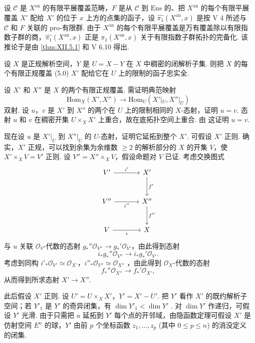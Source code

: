 设 $\mathcal{C}$ 是 $X^{\mathrm{an}}$ 的有限平展覆盖范畴，$F$ 是从 $\mathcal{C}$ 到 $\mathrm{Ens}$ 的、把 $X^{\mathrm{an}}$ 的每个有限平展覆盖 $X'$ 配给 $X'$ 的位于 $x$ 上方的点集的函子，设 $\widehat{\pi_1}(X^{\mathrm{an}}, x)$ 是按 V 4 所述与 $\mathcal{C}$ 和 $F$ 关联的 pro-有限群. 由于 $X^{\mathrm{an}}$ 的每个有限平展覆盖是万有覆盖除以有限指数子群的商，$\widehat{\pi_1}(X^{\mathrm{an}}, x)$ 正是 $\pi_1(X^{\mathrm{an}}, x)$ 关于有限指数子群拓扑的完备化. 该推论于是由 \ref{thm:XII.5.1} 和 V 6.10 得出.

\begin{proposition}\label{prop:XII.5.3}
设 $X$ 是正规解析空间，$Y$ 是 $U = X - Y$ 在 $X$ 中稠密的闭解析子集. 则把 $X$ 的每个有限正规覆盖 (5.0) $X'$ 配给它在 $U$ 上的限制的函子忠实全.
\end{proposition}

设 $X'$ 和 $X''$ 是 $X$ 的两个有限正规覆盖. 需证明典范映射
\[
\mathrm{Hom}_X(X', X'') \longrightarrow \mathrm{Hom}_U(X'|_U, X''|_U)
\]
双射. 设 $u$，$v$ 是 $X'$ 到 $X''$ 的两个在 $U$ 上的限制相同的 $X$-态射，证明 $u = v$. 态射 $u$ 和 $v$ 在稠密开集 $U \times_X X'$ 上重合，故在底拓扑空间上重合. 由 \cite[第 19 号 §4 推论 5]{exp12-4} 这证明 $u = v$.

现在设 $u$ 是 $X'|_U$ 到 $X''|_U$ 的 $U$-态射，证明它延拓到整个 $X'$. 可假设 $X'$ 正则. 确实，$X'$ 正规，可以找到余集为余维数 $\geqslant 2$ 的解析部分的 $X$ 的开集 $V$，使 $X' \times_X V = V'$ 正则. 设 $V'' = X'' \times_X V$，假设命题对 $V$ 已证. 考虑交换图式
\[
\begin{tikzcd}[row sep=large, column sep=large]
V' \arrow[r,"{i'}"] & X' \arrow[d,"{f'}"] \\
V'' \arrow[r,"{i''}"'] & X'' \arrow[d,"{f''}"] \\
V \arrow[r,"{i}"'] & X
\end{tikzcd}
\]
与 $u$ 关联 $\mathcal{O}_V$-代数的态射 $g_*'' \mathcal{O}_{V''} \to g_*' \mathcal{O}_{V'}$，由此得到态射
\[
i_* g_*'' \mathcal{O}_{V''} \longrightarrow i_* g_*' \mathcal{O}_{V'}.
\]
考虑到同构 $i'_* \mathcal{O}_{V'} \simeq \mathcal{O}_{X'}$，$i''_* \mathcal{O}_{V''} \simeq \mathcal{O}_{X''}$ \cite[第 3 号 命题 4]{exp12-11}，由此得到 $\mathcal{O}_X$-代数的态射
\[
f_*'' \mathcal{O}_{X''} \longrightarrow f_*' \mathcal{O}_{X'},
\]
从而得到所求态射 $X' \to X''$.

此后假设 $X'$ 正则. 设 $U' = U \times_X X'$，$Y' = X' - U'$. 把 $Y'$ 看作 $X'$ 的既约解析子空间；若 $Y'_1$ 是 $Y'$ 的奇异闭集，有 $\dim Y'_1 < \dim Y'$ \cite[第 20 号 D. 定理 3]{exp12-4}. 对 $\dim Y'$ 作递归，可假设 $Y'$ 光滑. 由于只需把 $u$ 延拓到 $Y'$ 每个点的开邻域，由隐函数定理可假设 $X'$ 是仿射空间 $E^n$ 的球，$Y'$ 由前 $p$ 个坐标函数 $z_1, \ldots, z_p$ (其中 $0 \leqslant p \leqslant n$) 的消没定义的闭集.

